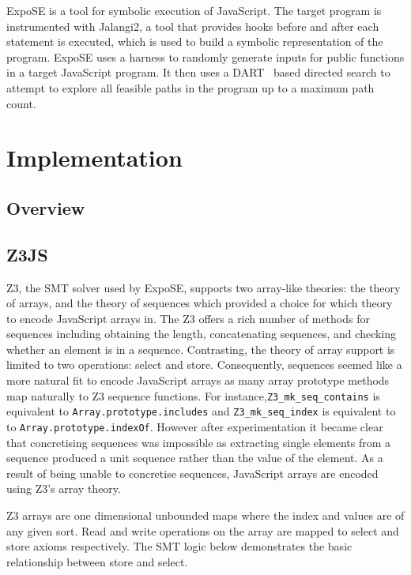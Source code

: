 \documentclass[]{final_report}
\begin{document}
ExpoSE is a tool for symbolic execution of JavaScript. The target program is instrumented with Jalangi2, a tool that provides hooks before and after each statement is executed, which is used to build a symbolic representation of the program. ExpoSE uses a harness to randomly generate inputs for public functions in a target JavaScript program. It then uses a DART~\cite{godefroid2005dart} based directed search to attempt to explore all feasible paths in the program up to a maximum path count.

\chapter{Implementation}

\section{Overview}

\section{Z3JS}
Z3, the SMT solver used by ExpoSE, supports two array-like theories: the theory of arrays, and the theory of sequences which provided a choice for which theory to encode JavaScript arrays in. The Z3 offers a rich number of methods for sequences including obtaining the length, concatenating sequences, and checking whether an element is in a sequence. Contrasting, the theory of array support is limited to two operations: select and store. Consequently, sequences seemed like a more natural fit to encode JavaScript arrays as many array prototype methods map naturally to Z3 sequence functions. For instance,\lstinline{Z3_mk_seq_contains} is equivalent to \lstinline{Array.prototype.includes} and \lstinline{Z3_mk_seq_index} is equivalent to to \lstinline{Array.prototype.indexOf}. However after experimentation it became clear that concretising sequences was impossible as extracting single elements from a sequence produced a unit sequence rather than the value of the element. As a result of being unable to concretise sequences, JavaScript arrays are encoded using Z3’s array theory.


Z3 arrays are one dimensional unbounded maps where the index and values are of any given sort. Read and write operations on the array are mapped to select and store axioms respectively. The SMT logic below demonstrates the basic relationship between store and select.
\end{document}
